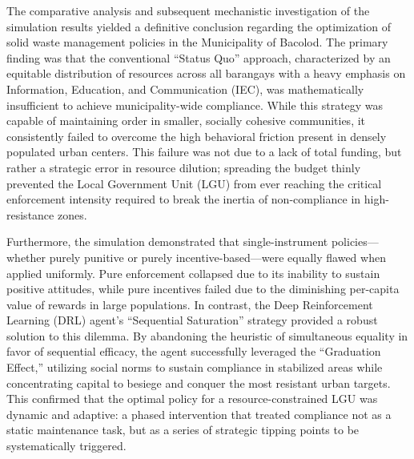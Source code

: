 
The comparative analysis and subsequent mechanistic investigation of the simulation results yielded a definitive conclusion regarding the optimization of solid waste management policies in the Municipality of Bacolod. The primary finding was that the conventional ``Status Quo'' approach, characterized by an equitable distribution of resources across all barangays with a heavy emphasis on Information, Education, and Communication (IEC), was mathematically insufficient to achieve municipality-wide compliance. While this strategy was capable of maintaining order in smaller, socially cohesive communities, it consistently failed to overcome the high behavioral friction present in densely populated urban centers. This failure was not due to a lack of total funding, but rather a strategic error in resource dilution; spreading the budget thinly prevented the Local Government Unit (LGU) from ever reaching the critical enforcement intensity required to break the inertia of non-compliance in high-resistance zones.

Furthermore, the simulation demonstrated that single-instrument policies---whether purely punitive or purely incentive-based---were equally flawed when applied uniformly. Pure enforcement collapsed due to its inability to sustain positive attitudes, while pure incentives failed due to the diminishing per-capita value of rewards in large populations. In contrast, the Deep Reinforcement Learning (DRL) agent's ``Sequential Saturation'' strategy provided a robust solution to this dilemma. By abandoning the heuristic of simultaneous equality in favor of sequential efficacy, the agent successfully leveraged the ``Graduation Effect,'' utilizing social norms to sustain compliance in stabilized areas while concentrating capital to besiege and conquer the most resistant urban targets. This confirmed that the optimal policy for a resource-constrained LGU was dynamic and adaptive: a phased intervention that treated compliance not as a static maintenance task, but as a series of strategic tipping points to be systematically triggered.